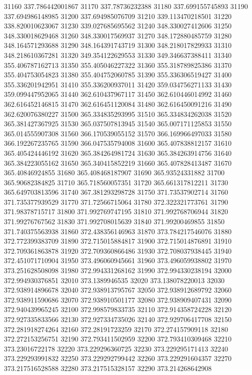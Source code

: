 {31160 337.786442001867
31170 337.78736232388
31180 337.699155745893
31190 337.694986148985
31200 337.694985076709
31210 339.113470218501
31220 338.820010623067
31230 339.027685695562
31240 348.330027412606
31250 348.330018629468
31260 348.330017569937
31270 348.172880485759
31280 348.164571293688
31290 348.164391743719
31300 348.218017829933
31310 348.218610367281
31320 349.354122629553
31330 349.346637388411
31340 355.406787162713
31350 355.405046227322
31360 355.318789825386
31370 355.404753054823
31380 355.404752060785
31390 355.336306519427
31400 355.336201942951
31410 355.336200937011
31420 359.034756271133
31430 359.099447952065
31440 362.610437967117
31450 362.610446014992
31460 362.616452146815
31470 362.616451120084
31480 362.616450091216
31490 362.620076380227
31500 365.334835293995
31510 365.334834262038
31520 365.381427367925
31530 365.037507813945
31540 365.007171125853
31550 365.014555907308
31560 366.170539055152
31570 366.169966497033
31580 366.192267235765
31590 366.047535794008
31600 365.407838812157
31610 365.405424446192
31620 365.384264981724
31630 365.384263914756
31640 365.384223055162
31650 365.340415852219
31660 365.407828413487
31670 365.40846924855
31680 365.408468187907
31690 365.93524331882
31700 365.90682384825
31710 365.718560057351
31720 365.661317812211
31730 365.649703813596
31740 367.381293298728
31750 371.73537902714
31760 371.735377939529
31770 371.72566715064
31780 372.322321773761
31790 371.98378715717
31800 371.992769747195
31810 371.992768706944
31820 371.99276767562
31830 371.992708015639
31840 371.99200469855
31850 371.740375563938
31860 372.438356146963
31870 373.784217546076
31880 372.772399383709
31890 372.715015884817
31900 372.715014876891
31910 372.709361863878
31920 372.709360866486
31930 372.708037938445
31940 372.451071710904
31950 373.496060945661
31960 373.496059938802
31970 373.251628508098
31980 372.994331268162
31990 372.994330238194
32000 372.994930376851
32010 373.1389946535
32020 373.138078220013
32030 372.938914896678
32040 372.938913795767
32050 372.938912689792
32060 372.938911590686
32070 372.938910501177
32080 372.938909407431
32090 372.940439965245
32100 372.998579833735
32110 372.914358724228
32120 372.927335833566
32130 372.927334735026
32140 372.929706417708
32150 372.281918274264
32160 372.28191723259
32170 372.274157909118
32180 372.272153256751
32190 372.793411502959
32200 372.793410309468
32210 373.23016722178
32220 373.229296360725
32230 373.229295171413
32240 373.229293991832
32250 373.229292799442
32260 373.229291604357
32270 373.217516528588
32280 373.217515328157
32290 373.214268642908
}
